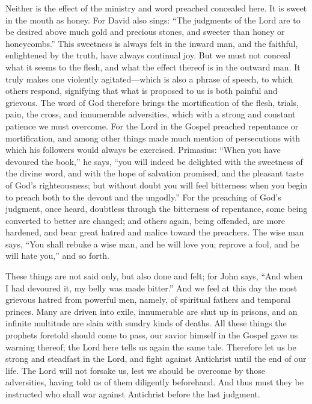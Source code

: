Neither is the effect of the ministry and word preached concealed here. It is sweet in the mouth as honey. For David also sings: “The judgments of the Lord are to be desired above much gold and precious stones, and sweeter than honey or honeycombs.” This sweetness is always felt in the inward man, and the faithful, enlightened by the truth, have always continual joy. But we must not conceal what it seems to the flesh, and what the effect thereof is in the outward man. It truly makes one violently agitated—which is also a phrase of speech, to which others respond, signifying that what is proposed to us is both painful and grievous. The word of God therefore brings the mortification of the flesh, trials, pain, the cross, and innumerable adversities, which with a strong and constant patience we must overcome. For the Lord in the Gospel preached repentance or mortification, and among other things made much mention of persecutions with which his followers would always be exercised. Primasius: “When you have devoured the book,” he says, “you will indeed be delighted with the sweetness of the divine word, and with the hope of salvation promised, and the pleasant taste of God’s righteousness; but without doubt you will feel bitterness when you begin to preach both to the devout and the ungodly.” For the preaching of God’s judgment, once heard, doubtless through the bitterness of repentance, some being converted to better are changed; and others again, being offended, are more hardened, and bear great hatred and malice toward the preachers. The wise man says, “You shall rebuke a wise man, and he will love you; reprove a fool, and he will hate you,” and so forth.

These things are not said only, but also done and felt; for John says, “And when I had devoured it, my belly was made bitter.” And we feel at this day the most grievous hatred from powerful men, namely, of spiritual fathers and temporal princes. Many are driven into exile, innumerable are shut up in prisons, and an infinite multitude are slain with sundry kinds of deaths. All these things the prophets foretold should come to pass, our savior himself in the Gospel gave us warning thereof; the Lord here tells us again the same tale. Therefore let us be strong and steadfast in the Lord, and fight against Antichrist until the end of our life. The Lord will not forsake us, lest we should be overcome by those adversities, having told us of them diligently beforehand. And thus must they be instructed who shall war against Antichrist before the last judgment.

